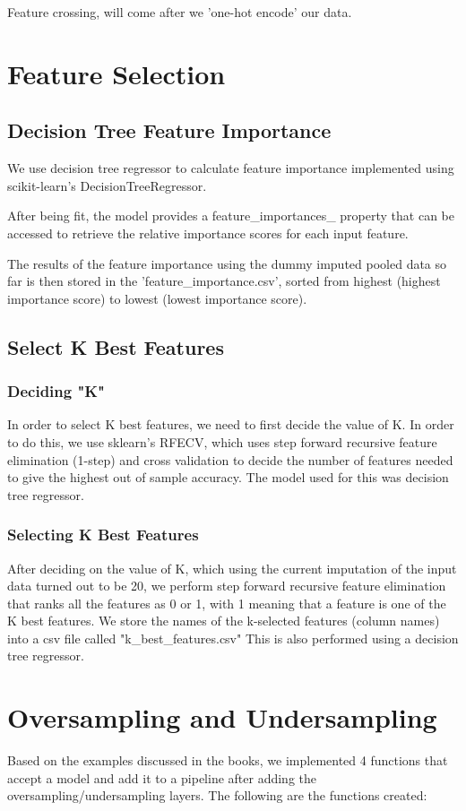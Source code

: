 \documentclass{article}
\begin{document}
\noindent Feature crossing, will come after we 'one-hot encode' our data.


\section{Feature Selection}
\subsection{Decision Tree Feature Importance}
We use decision tree regressor to calculate feature importance implemented using scikit-learn's DecisionTreeRegressor.

After being fit, the model provides a feature\_importances\_ property that can be accessed to retrieve the relative importance scores for each input feature.

The results of the feature importance using the dummy imputed pooled data so far is then stored in the 'feature\_importance.csv', sorted from highest (highest importance score) to lowest (lowest importance score).

\subsection{Select K Best Features}
\subsubsection{Deciding "K"}
In order to select K best features, we need to first decide the value of K. In order to do this, we use sklearn's RFECV, which uses step forward recursive feature elimination (1-step) and cross validation to decide the number of features needed to give the highest out of sample accuracy. The model used for this was decision tree regressor.

\subsubsection{Selecting K Best Features}
After deciding on the value of K, which using the current imputation of the input data turned out to be 20, we perform step forward recursive feature elimination that ranks all the features as 0 or 1, with 1 meaning that a feature is one of the K best features. We store the names of the k-selected features (column names) into a csv file called "k\_best\_features.csv" This is also performed using a decision tree regressor.

\section{Oversampling and Undersampling}
Based on the examples discussed in the books, we implemented 4 functions that accept a model and add it to a pipeline after adding the oversampling/undersampling layers. The following are the functions created:
\end{document}
